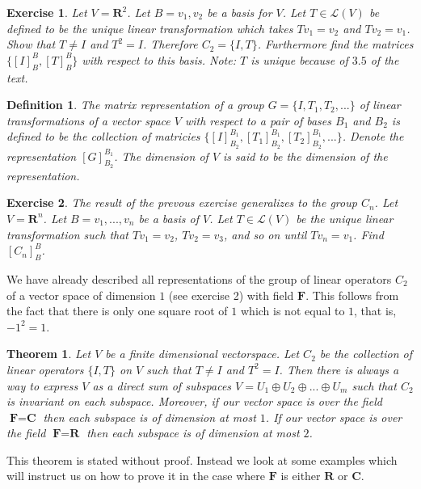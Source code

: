 \documentclass{article}
\theoremstyle{problemstyle}
\newtheorem{theorem}{Theorem}
\newtheorem{exercise}{Exercise}
\newtheorem{definition}{Definition}
\begin{document}
\begin{exercise}
Let $V = \textbf{R}^2$. Let $B = v_1, v_2$ be a basis for $V$. Let $T \in \mathscr{L}(V)$ be defined to be the unique linear transformation which takes $Tv_1 = v_2$ and $Tv_2 = v_1$. Show that $T \neq I$ and $T^2 = I$. Therefore $C_2 = \{I,T\}$. Furthermore find the matrices $\{[I]^B_B,[T]^B_B\}$ with respect to this basis.  Note: $T$ is unique because of $3.5$ of the text.  
\end{exercise}

\begin{definition}
The matrix representation of a group $G = \{I, T_1, T_2, ...\}$ of linear transformations of a vector space $V$ with respect to a pair of bases $B_1$ and $B_2$ is defined to be the collection of matricies $\{[I]^{B_1}_{B_2}, [T_1]^{B_1}_{B_2}, [T_2]^{B_1}_{B_2}, ...\}$. Denote the representation $[G]^{B_1}_{B_2}$. The dimension of $V$ is said to be the dimension of the representation. 
\end{definition}

\begin{exercise}
The result of the prevous exercise generalizes to the group $C_n$. Let $V = \textbf{R}^n$. Let $B = v_1,...,v_n$ be a basis of $V$. Let $T \in \mathscr{L}(V)$ be the unique linear transformation such that $Tv_1 = v_2$, $Tv_2 = v_3$, and so on until $Tv_n = v_1$. Find $[C_n]^{B}_{B}$.
\end{exercise}

We have already described all representations of the group of linear operators $C_2$ of a vector space of dimension $1$ (see exercise 2) with field $\textbf{F}$. This follows from the fact that there is only one square root of $1$ which is not equal to $1$, that is, $-1^2 = 1$. 

\begin{theorem}
Let $V$ be a finite dimensional vectorspace. Let $C_2$ be the collection of linear operators $\{I,T\}$ on $V$ such that $T \neq I$ and $T^2 = I$. Then there is always a way to express $V$ as a direct sum of subspaces $V = U_1 \oplus U_2 \oplus ... \oplus U_m$ such that $C_2$ is invariant on each subspace. Moreover, if our vector space is over the field $\textbf{F} = \textbf{C}$ then each subspace is of dimension at most $1$.  If our vector space is over the field $\textbf{F} = \textbf{R}$ then each subspace is of dimension at most $2$. 
\end{theorem}

This theorem is stated without proof. Instead we look at some examples which will instruct us on how to prove it in the case where $\textbf{F}$ is either $\textbf{R}$ or $\textbf{C}$.\\ 
\end{document}

